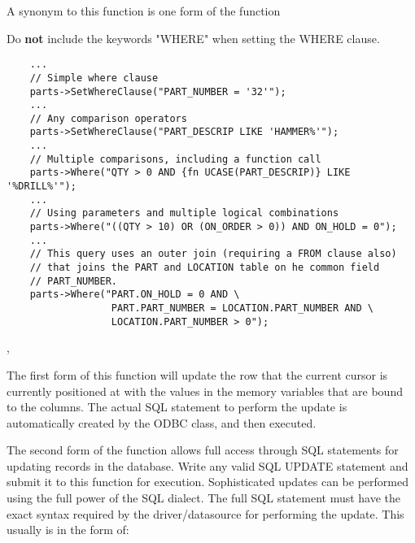 A synonym to this function is one form of the function 




Do {\bf not} include the keywords "WHERE" when setting the WHERE clause.


\begin{verbatim}
    ...
    // Simple where clause
    parts->SetWhereClause("PART_NUMBER = '32'");
    ...
    // Any comparison operators
    parts->SetWhereClause("PART_DESCRIP LIKE 'HAMMER%'");
    ...
    // Multiple comparisons, including a function call
    parts->Where("QTY > 0 AND {fn UCASE(PART_DESCRIP)} LIKE '%DRILL%'");
    ...
    // Using parameters and multiple logical combinations
    parts->Where("((QTY > 10) OR (ON_ORDER > 0)) AND ON_HOLD = 0");
    ...
    // This query uses an outer join (requiring a FROM clause also)
    // that joins the PART and LOCATION table on he common field
    // PART_NUMBER.
    parts->Where("PART.ON_HOLD = 0 AND \
                  PART.PART_NUMBER = LOCATION.PART_NUMBER AND \
                  LOCATION.PART_NUMBER > 0");
\end{verbatim}


,

\label{wxdbtableupdate}



The first form of this function will update the row that the current cursor
is currently positioned at with the values in the memory variables that
are bound to the columns.  The actual SQL statement to perform the update
is automatically created by the ODBC class, and then executed.

The second form of the function allows full access through SQL statements for
updating records in the database.  Write any valid SQL UPDATE statement and
submit it to this function for execution.  Sophisticated updates can be
performed using the full power of the SQL dialect. The full SQL statement
must have  the exact syntax required by the driver/datasource for performing
the update.  This usually is in the form of:

